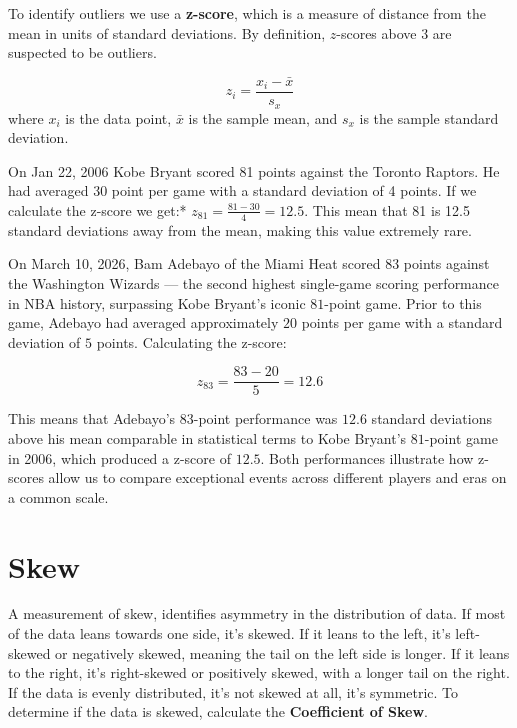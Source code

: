 \documentclass[
  11pt,
  letterpaper,
  DIV=11,
  numbers=noendperiod,
  oneside,
  open=any]{scrreprt}
\begin{document}
To identify outliers we use a \textbf{z-score}, which is a measure of
distance from the mean in units of standard deviations. By definition,
\(z\)-scores above \(3\) are suspected to be outliers.

\begin{bsformula}

\[z_{i}=\frac{x_i-\bar{x}}{s_x}\] where \(x_i\) is the data point,
\(\bar{x}\) is the sample mean, and \(s_x\) is the sample standard
deviation.

\end{bsformula}

\begin{bsexample}[Example]

On Jan 22, 2006 Kobe Bryant scored 81 points against the Toronto
Raptors. He had averaged 30 point per game with a standard deviation of
4 points. If we calculate the z-score we get:*
\(z_{81}=\frac{81-30}{4}=12.5\). This mean that 81 is 12.5 standard
deviations away from the mean, making this value extremely rare.

\end{bsexample}

\begin{bsexample}[Example]

On March 10, 2026, Bam Adebayo of the Miami Heat scored \(83\) points
against the Washington Wizards --- the second highest single-game
scoring performance in NBA history, surpassing Kobe Bryant's iconic
\(81\)-point game. Prior to this game, Adebayo had averaged
approximately \(20\) points per game with a standard deviation of \(5\)
points. Calculating the z-score:

\[z_{83}=\frac{83-20}{5}=12.6\]

This means that Adebayo's \(83\)-point performance was \(12.6\) standard
deviations above his mean comparable in statistical terms to Kobe
Bryant's \(81\)-point game in 2006, which produced a z-score of
\(12.5\). Both performances illustrate how z-scores allow us to compare
exceptional events across different players and eras on a common scale.

\end{bsexample}

\section{Skew}\label{skew}

A measurement of skew, identifies asymmetry in the distribution of data.
If most of the data leans towards one side, it's skewed. If it leans to
the left, it's left-skewed or negatively skewed, meaning the tail on the
left side is longer. If it leans to the right, it's right-skewed or
positively skewed, with a longer tail on the right. If the data is
evenly distributed, it's not skewed at all, it's symmetric. To determine
if the data is skewed, calculate the \textbf{Coefficient of Skew}.
\end{document}

